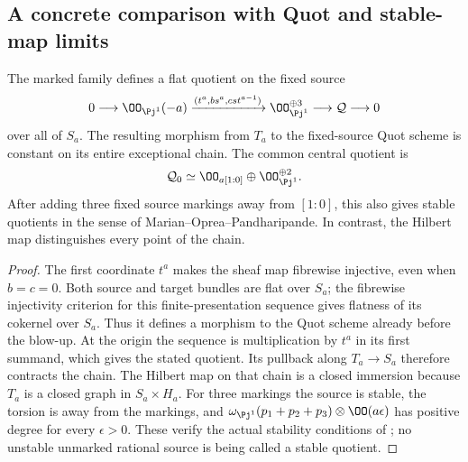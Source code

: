 \subsection{A concrete comparison with Quot and stable-map limits}
\begin{proposition}
\label{prop:quot-contraction-v169}
The marked family defines a flat quotient on the fixed source
\begin{equation}\label{eq:quot-sequence-v169}
 0\longrightarrow\OO_{\Pj^1}(-a)
   \xrightarrow{(t^a,bs^a,cst^{a-1})}\OO_{\Pj^1}^{\oplus3}
   \longrightarrow\mathcal Q\longrightarrow0
\end{equation}
over all of $S_a$. The resulting morphism from $T_a$ to the fixed-source
Quot scheme is constant on its entire exceptional chain. The common
central quotient is
\[
 \mathcal Q_0\simeq\OO_{a[1:0]}\oplus\OO_{\Pj^1}^{\oplus2}.
\]
After adding three fixed source markings away from $[1:0]$, this also
gives stable quotients in the sense of Marian--Oprea--Pandharipande.
In contrast, the Hilbert map distinguishes every point of the chain.
\end{proposition}
\begin{proof}
The first coordinate $t^a$ makes the sheaf map fibrewise injective,
even when $b=c=0$. Both source and target bundles are flat over $S_a$;
the fibrewise injectivity criterion for this finite-presentation
sequence gives flatness of its cokernel over $S_a$. Thus it defines
a morphism to the Quot scheme already before the blow-up. At the
origin the sequence is multiplication by $t^a$ in its first summand,
which gives the stated quotient. Its pullback along $T_a\to S_a$
therefore contracts the chain. The Hilbert map on that chain is a
closed immersion because $T_a$ is a closed graph in $S_a\times H_a$.
For three markings the source is stable, the torsion is away from
the markings, and $\omega_{\Pj^1}(p_1+p_2+p_3)\otimes\OO(a\epsilon)$
has positive degree for every $\epsilon>0$. These verify the actual
stability conditions of \cite[Section~2]{MOP169}; no unstable
unmarked rational source is being called a stable quotient.
\end{proof}


